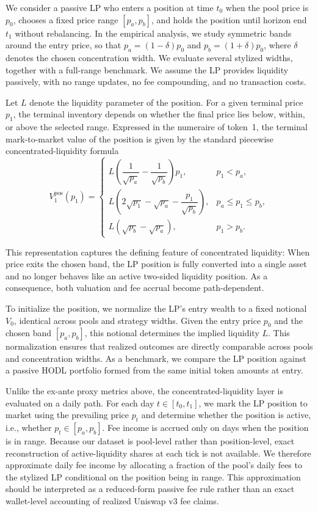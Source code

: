 \documentclass[anonymous]{lipics-v2021}
\begin{document}
{We consider a passive LP who enters a position at time $t_0$ when the pool price is $p_0$, chooses a fixed price range $[p_a,p_b]$, and holds the position until horizon end $t_1$ without rebalancing. In the empirical analysis, we study symmetric bands around the entry price, so that $p_a=(1-\delta)p_0$ and $p_b=(1+\delta)p_0$, where $\delta$ denotes the chosen concentration width. We evaluate several stylized widths, together with a full-range benchmark. We assume the LP provides liquidity passively, with no range updates, no fee compounding, and no transaction costs.}

{Let $L$ denote the liquidity parameter of the position. For a given terminal price $p_1$, the terminal inventory depends on whether the final price lies below, within, or above the selected range. Expressed in the numeraire of token~1, the terminal mark-to-market value of the position is given by the standard piecewise concentrated-liquidity formula}
\begin{equation}
\label{eq:v3_terminal_value}
V^{\mathrm{pos}}_1(p_1)=
\begin{cases}
L\left(\dfrac{1}{\sqrt{p_a}}-\dfrac{1}{\sqrt{p_b}}\right)p_1, & p_1 < p_a,\\[1.0em]
L\left(2\sqrt{p_1}-\sqrt{p_a}-\dfrac{p_1}{\sqrt{p_b}}\right), & p_a \le p_1 \le p_b,\\[1.0em]
L\left(\sqrt{p_b}-\sqrt{p_a}\right), & p_1 > p_b.
\end{cases}
\end{equation}

{This representation captures the defining feature of concentrated liquidity: When price exits the chosen band, the LP position is fully converted into a single asset and no longer behaves like an active two-sided liquidity position. As a consequence, both valuation and fee accrual become path-dependent.}

{To initialize the position, we normalize the LP’s entry wealth to a fixed notional $V_0$, identical across pools and strategy widths. Given the entry price $p_0$ and the chosen band $[p_a,p_b]$, this notional determines the implied liquidity $L$. This normalization ensures that realized outcomes are directly comparable across pools and concentration widths. As a benchmark, we compare the LP position against a passive HODL portfolio formed from the same initial token amounts at entry.}

{Unlike the ex-ante proxy metrics above, the concentrated-liquidity layer is evaluated on a daily path. For each day $t \in [t_0,t_1]$, we mark the LP position to market using the prevailing price $p_t$ and determine whether the position is active, i.e., whether $p_t \in [p_a,p_b]$. Fee income is accrued only on days when the position is in range. Because our dataset is pool-level rather than position-level, exact reconstruction of active-liquidity shares at each tick is not available. We therefore approximate daily fee income by allocating a fraction of the pool’s daily fees to the stylized LP conditional on the position being in range. This approximation should be interpreted as a reduced-form passive fee rule rather than an exact wallet-level accounting of realized Uniswap v3 fee claims.}
\end{document}
